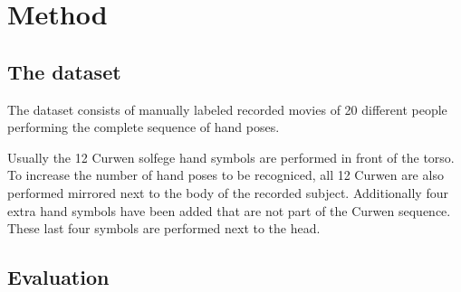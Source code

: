 \chapter{Method}
\label{ch:method}

\section{The dataset}
The dataset consists of manually labeled recorded movies of 20 different people
performing the complete sequence of hand poses.

Usually the 12 Curwen solfege hand symbols are performed in front of the torso.
To increase the number of hand poses to be recogniced, all 12 Curwen are also
performed mirrored next to the body of the recorded subject.  Additionally four
extra hand symbols have been added that are not part of the Curwen sequence.
These last four symbols are performed next to the head.



\section{Evaluation}
